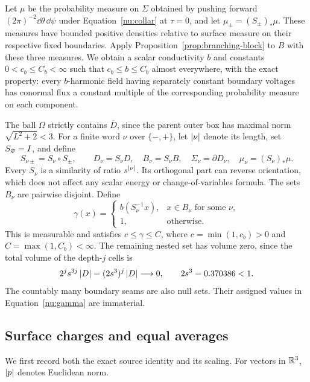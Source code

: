 Let \(\mu\) be the probability measure on \(\Sigma\) obtained
by pushing forward \((2\pi)^{-2}\dd\theta\,\dd\psi\) under
Equation~\eqref{nu:collar} at \(\tau=0\), and let
\(\mu_\pm=(S_\pm)_*\mu\). These measures have bounded positive
densities relative to surface measure on their respective fixed
boundaries. Apply Proposition~\ref{prop:branching-block} to \(B\)
with these three measures. We obtain a scalar conductivity
\(b\) and constants \(0<c_b\le C_b<\infty\) such that
\(c_b\le b\le C_b\) almost everywhere, with the exact property:
every \(b\)-harmonic field having separately constant boundary
voltages has conormal flux a constant multiple of the corresponding
probability measure on each component.

The ball \(\Omega\) strictly contains \(\overline D\), since the
parent outer box has maximal norm \(\sqrt{L^2+2}<3\).
For a finite word \(\nu\) over \(\{-,+\}\), let \(\left\lvert \nu\right\rvert\)
denote its length, set \(S_\varnothing=I\), and define
\[
 S_{\nu\pm}=S_\nu\circ S_\pm,\qquad
 D_\nu=S_\nu D,\quad B_\nu=S_\nu B,\quad
 \Sigma_\nu=\partial D_\nu,\quad \mu_\nu=(S_\nu)_*\mu.
\]
Every \(S_\nu\) is a similarity of ratio \(s^{\left\lvert \nu\right\rvert}\).
Its orthogonal part can reverse orientation, which does not affect
any scalar energy or change-of-variables formula. The sets \(B_\nu\)
are pairwise disjoint. Define
\begin{equation}\label{nu:gamma}
 \gamma(x)=
 \begin{cases}
  b(S_\nu^{-1}x),&x\in B_\nu\text{ for some }\nu,\\
  1,&\text{otherwise}.
 \end{cases}
\end{equation}
This is measurable and satisfies
\(c\le\gamma\le C\), where
\(c=\min(1,c_b)>0\) and \(C=\max(1,C_b)<\infty\).
The remaining nested set has volume zero, since the total volume of
the depth-\(j\) cells is
\begin{equation}\label{nu:null-set}
 2^j s^{3j}\left\lvert D\right\rvert=(2s^3)^j\left\lvert D\right\rvert\longrightarrow0,
 \qquad 2s^3=0.370386<1.
\end{equation}
The countably many boundary seams are also null sets. Their assigned
values in Equation~\eqref{nu:gamma} are immaterial.

\subsection{Surface charges and equal averages}

We first record both the exact source identity and its scaling.
For vectors in \(\mathbb R^3\), \(\left\lvert p\right\rvert\) denotes Euclidean norm.

